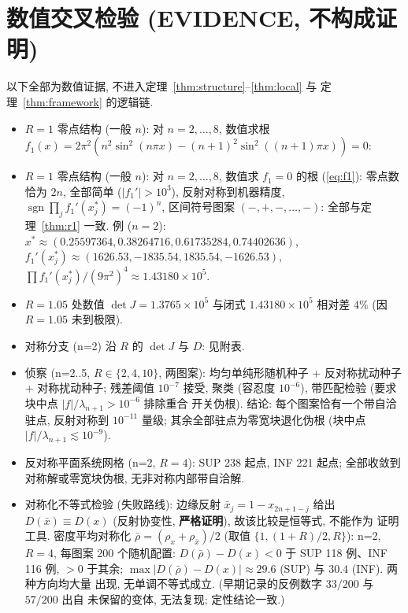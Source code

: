 \documentclass[UTF8]{ctexart}
\newcommand{\STRICT}{\textbf{严格证明}}
\begin{document}
\section{数值交叉检验 (EVIDENCE, 不构成证明)}\label{sec:evidence}

以下全部为数值证据, 不进入定理~\ref{thm:structure}--\ref{thm:local} 与
定理~\ref{thm:framework} 的逻辑链.

\begin{itemize}
	\item $R=1$ 零点结构 (一般 $n$): 对 $n=2,\dots,8$, 数值求根
	$f_1(x)=2\pi^2(n^2\sin^2(n\pi x)-(n+1)^2\sin^2((n+1)\pi x))=0$:
	\item $R=1$ 零点结构 (一般 $n$): 对 $n=2,\dots,8$, 数值求 $f_1=0$ 的根
	(\eqref{eq:f1}):
	零点数恰为 $2n$, 全部简单 ($|f_1'|>10^3$), 反射对称到机器精度,
	$\operatorname{sgn}\prod_jf_1'(x_j^*)=(-1)^n$, 区间符号图案
	$(-,+,-,\dots,-)$: 全部与定理~\ref{thm:r1} 一致. 例 ($n=2$):
	$x^*\approx(0.25597364,0.38264716,0.61735284,0.74402636)$,
	$f_1'(x_j^*)\approx(1626.53,-1835.54,1835.54,-1626.53)$,
	$\prod f_1'(x_j^*)/(9\pi^2)^4\approx1.43180\times10^5$.
	\item $R=1.05$ 处数值 $\det J=1.3765\times10^5$ 与闭式
	$1.43180\times10^5$ 相对差 $4\%$ (因 $R=1.05$ 未到极限).
	\item 对称分支 (n=2) 沿 $R$ 的 $\det J$ 与 $D$: 见附表.
	\item 侦察 (n=2..5, $R\in\{2,4,10\}$, 两图案): 均匀单纯形随机种子 +
	反对称扰动种子 + 对称扰动种子; 残差阈值 $10^{-7}$ 接受, 聚类 (容忍度
	$10^{-6}$), 带匹配检验 (要求块中点 $|f|/\lambda_{n+1}>10^{-6}$ 排除重合
	开关伪根). 结论: 每个图案恰有一个带自洽驻点, 反射对称到 $10^{-11}$ 量级;
	其余全部驻点为零宽块退化伪根 (块中点 $|f|/\lambda_{n+1}\lesssim10^{-9}$).
	\item 反对称平面系统网格 (n=2, $R=4$): SUP 238 起点, INF 221 起点;
	全部收敛到对称解或零宽块伪根, 无非对称内部带自洽解.
	\item 对称化不等式检验 (失败路线): 边缘反射 $\bar x_j=1-x_{2n+1-j}$ 给出
	$D(\bar x)\equiv D(x)$ (反射协变性, \STRICT), 故该比较是恒等式, 不能作为
	证明工具. 密度平均对称化 $\bar\rho=(\rho_x+\rho_{\bar x})/2$ (取值
	$\{1,(1+R)/2,R\}$): n=2, $R=4$, 每图案 200 个随机配置:
	$D(\bar\rho)-D(x)<0$ 于 SUP 118 例、INF 116 例, $>0$ 于其余;
	$\max|D(\bar\rho)-D(x)|\approx29.6$ (SUP) 与 $30.4$ (INF). 两种方向均大量
	出现, 无单调不等式成立. (早期记录的反例数字 $33/200$ 与 $57/200$ 出自
	未保留的变体, 无法复现; 定性结论一致.)
\end{itemize}
\end{document}

